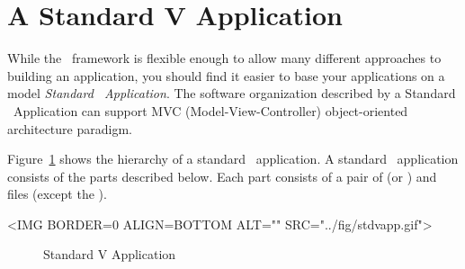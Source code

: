 \section{A Standard V Application}

While the \V\ framework is flexible enough to allow many different
approaches to building an application, you should find it easier
to base your applications on a model \emph{Standard \V\ Application}.
The software organization described by a Standard \V\ Application
can support MVC (Model-View-Controller) object-oriented architecture paradigm.

Figure~\ref{fig:stdvapp} shows the hierarchy of a standard \V\ application.
A standard \V\ application consists of the parts described below.
Each part consists of a pair of  (or ) and
 files (except the ).

\begin{rawhtml}
<IMG BORDER=0 ALIGN=BOTTOM ALT="" SRC="../fig/stdvapp.gif">
\end{rawhtml}

\begin{figure}[htb]
\begin{center}
\vspace{.1in}

\small
\begin{latexonly}

\end{latexonly}
\normalfont\normalsize
\end{center}

\caption{Standard V Application} \label{fig:stdvapp}

\end{figure}

